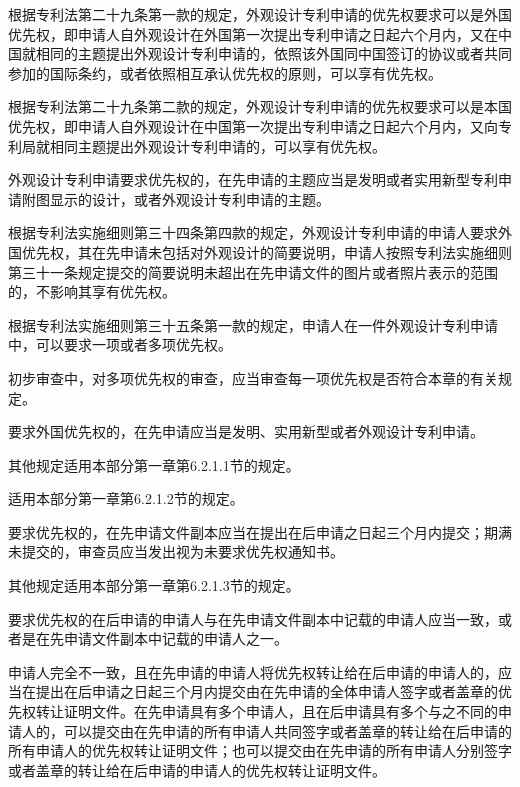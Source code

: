 根据专利法第二十九条第一款的规定，外观设计专利申请的优先权要求可以是外国优先权，即申请人自外观设计在外国第一次提出专利申请之日起六个月内，又在中国就相同的主题提出外观设计专利申请的，依照该外国同中国签订的协议或者共同参加的国际条约，或者依照相互承认优先权的原则，可以享有优先权。

根据专利法第二十九条第二款的规定，外观设计专利申请的优先权要求可以是本国优先权，即申请人自外观设计在中国第一次提出专利申请之日起六个月内，又向专利局就相同主题提出外观设计专利申请的，可以享有优先权。

外观设计专利申请要求优先权的，在先申请的主题应当是发明或者实用新型专利申请附图显示的设计，或者外观设计专利申请的主题。

根据专利法实施细则第三十四条第四款的规定，外观设计专利申请的申请人要求外国优先权，其在先申请未包括对外观设计的简要说明，申请人按照专利法实施细则第三十一条规定提交的简要说明未超出在先申请文件的图片或者照片表示的范围的，不影响其享有优先权。

根据专利法实施细则第三十五条第一款的规定，申请人在一件外观设计专利申请中，可以要求一项或者多项优先权。

初步审查中，对多项优先权的审查，应当审查每一项优先权是否符合本章的有关规定。

要求外国优先权的，在先申请应当是发明、实用新型或者外观设计专利申请。

其他规定适用本部分第一章第6.2.1.1节的规定。

适用本部分第一章第6.2.1.2节的规定。

要求优先权的，在先申请文件副本应当在提出在后申请之日起三个月内提交；期满未提交的，审查员应当发出视为未要求优先权通知书。

其他规定适用本部分第一章第6.2.1.3节的规定。

要求优先权的在后申请的申请人与在先申请文件副本中记载的申请人应当一致，或者是在先申请文件副本中记载的申请人之一。

申请人完全不一致，且在先申请的申请人将优先权转让给在后申请的申请人的，应当在提出在后申请之日起三个月内提交由在先申请的全体申请人签字或者盖章的优先权转让证明文件。在先申请具有多个申请人，且在后申请具有多个与之不同的申请人的，可以提交由在先申请的所有申请人共同签字或者盖章的转让给在后申请的所有申请人的优先权转让证明文件；也可以提交由在先申请的所有申请人分别签字或者盖章的转让给在后申请的申请人的优先权转让证明文件。

